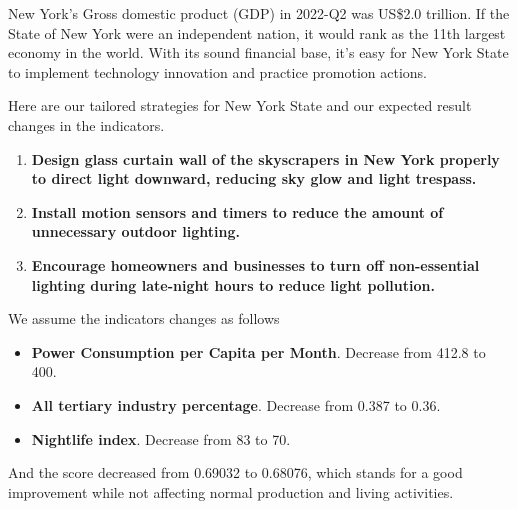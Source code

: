 New York's Gross domestic product (GDP) in 2022-Q2 was US\$2.0 trillion. If the State of New York were an independent nation, it would rank as the 11th largest economy in the world. With its sound financial base, it's easy for New York State to implement technology innovation and practice promotion actions.

Here are our tailored strategies for New York State and our expected result changes in the indicators.

\begin{enumerate}
    \item \textbf{Design glass curtain wall of the skyscrapers in New York properly to direct light downward, reducing sky glow and light trespass.} 

    \item \textbf{Install motion sensors and timers to reduce the amount of unnecessary outdoor lighting.}
    
    \item \textbf{Encourage homeowners and businesses to turn off non-essential lighting during late-night hours to reduce light pollution.}

\end{enumerate}

We assume the indicators changes as follows
\begin{itemize}
    \item \textbf{Power Consumption per Capita per Month}. Decrease from 412.8 to 400.
    \item \textbf{All tertiary industry percentage}. Decrease from 0.387 to 0.36.
    \item \textbf{Nightlife index}. Decrease from 83 to 70.
\end{itemize}

And the score decreased from 0.69032 to 0.68076, which stands for a good improvement while not affecting normal production and living activities.